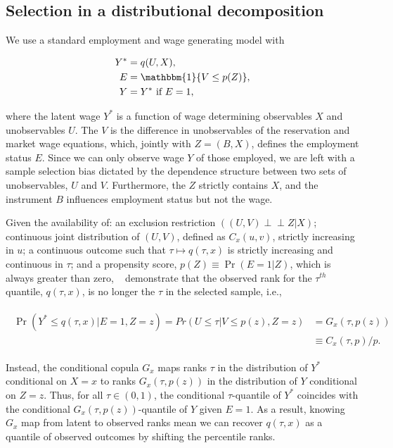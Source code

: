 \subsection{Selection in  a distributional decomposition} \label{subsec:decomposition}
We use a standard employment and wage generating model with 
\begin{linenomath*}\begin{align}
	Y^{*} &= q(U, X),\\
	E &= \mathbbm{1} \{V\leq p(Z)\},\\
	Y &= Y^{*} \text{~if~}E = 1,
\end{align} \end{linenomath*} 
where the latent wage $Y^{*}$ is a function of wage determining observables $X$ and unobservables $U$. The $V$ is the difference in unobservables of the reservation and market wage equations, which, jointly with $Z = (B,X)$, defines the employment status $E$. Since we can only observe wage $Y$ of  those employed, we are left with a sample selection bias dictated by the dependence structure between two sets of unobservables, $U$ and $V$. Furthermore, the $Z$ strictly contains $X$, and the instrument $B$ influences employment status but not the wage.\par

Given the availability of: an exclusion restriction $((U,V) {\perp\!\!\!\perp} Z| X )$; continuous joint distribution of $(U,V)$, defined as $C_{x}(u,v)$, strictly increasing in $u$; a continuous outcome such that $\tau\mapsto q(\tau, x)$ is strictly increasing and continuous in $\tau$; and a  propensity score, $p(Z)\equiv \Pr(E=1|Z)$, which is always greater than zero, ~\citet{Arellano2017} demonstrate that the observed rank for the $\tau^{th}$ quantile, $q(\tau, x)$, is no longer the $\tau$ in the selected sample, i.e.,
\begin{linenomath*}\begin{align}
	\begin{split}		
		\Pr(Y^{*}\leq q(\tau, x)|E=1, Z=z) = Pr(U\leq \tau| V\leq p(z), Z=z)
		&=G_{x}(\tau, p(z)) \\
		&\equiv C_{x}(\tau, p)/p.
	\end{split}
\end{align}\end{linenomath*}
Instead, the conditional copula $G_{x}$ maps ranks $\tau$ in the distribution of $Y^{*}$ conditional on $X=x$ to ranks $G_{x}(\tau, p(z))$ in the distribution of $Y$ conditional on $Z=z$. Thus,  for all $\tau \in (0,1)$, the conditional $\tau$-quantile of $Y^{*}$ coincides with the conditional $G_{x}(\tau, p(z))$-quantile of $Y$ given $E=1$. As a result, knowing $G_{x}$ map from latent to observed ranks mean we can recover $q(\tau, x)$ as a quantile of observed outcomes by shifting the percentile ranks. \par

